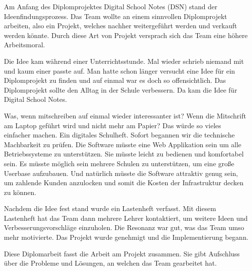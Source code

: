 
Am Anfang des Diplomprojektes Digital School Notes (\gls{DSN}) stand der Ideenfindungsprozess. Das Team wollte an einem sinnvollen Diplomprojekt arbeiten, also ein Projekt, welches nachher weitergeführt werden und verkauft werden könnte. Durch diese Art von Projekt versprach sich das Team eine höhere Arbeitsmoral. 

Die Idee kam während einer Unterrichtsstunde. Mal wieder schrieb niemand mit und kaum einer passte auf. Man hatte schon länger versucht eine Idee für ein Diplomprojekt zu finden und auf einmal war es doch so offensichtlich. Das Diplomprojekt sollte den Alltag in der Schule verbessern. Da kam die Idee für Digital School Notes.

Was, wenn mitschreiben auf einmal wieder interessanter ist? Wenn die Mitschrift am Laptop geführt wird und nicht mehr am Papier? Das würde so vieles einfacher machen. Ein digitales Schulheft. Sofort begannen wir die technische Machbarkeit zu prüfen. Die Software müsste eine Web Applikation sein um alle Betriebssysteme zu unterstützen. Sie müsste leicht zu bedienen und komfortabel sein. Es müsste möglich sein mehrere Schulen zu unterstützen, um eine große Userbase aufzubauen. Und natürlich müsste die Software attraktiv genug sein, um zahlende Kunden anzulocken und somit die Kosten der Infrastruktur decken zu können.

Nachdem die Idee fest stand wurde ein Lastenheft verfasst. Mit diesem Lastenheft hat das Team dann mehrere Lehrer kontaktiert, um weitere Ideen und Verbesserungsvorschläge einzuholen. Die Resonanz war gut, was das Team umso mehr motivierte. Das Projekt wurde genehmigt und die Implementierung begann.

Diese Diplomarbeit fasst die Arbeit am Projekt zusammen. Sie gibt Aufschluss über die Probleme und Lösungen, an welchen das Team gearbeitet hat.